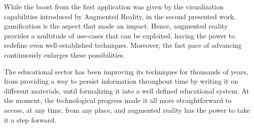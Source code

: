 \documentclass[12 pct]{report}
\begin{document}
While the boost from the first application was given by the visualization capabilities introduced by Augmented Reality, in the second presented work, gamification is the aspect that made an impact. Hence, augmented reality provides a multitude of use-cases that can be exploited, having the power to redefine even well-established techniques. Moreover, the fast pace of advancing continuously enlarges these possibilities.

The educational sector has been improving its techniques for thousands of years, from providing a way to persist information throughout time by writing it on different materials, until formalizing it into a well defined educational system. At the moment, the technological progress made it all more straightforward to access, at any time, from any place, and augmented reality has the power to take it a step forward.



 
\end{document}
